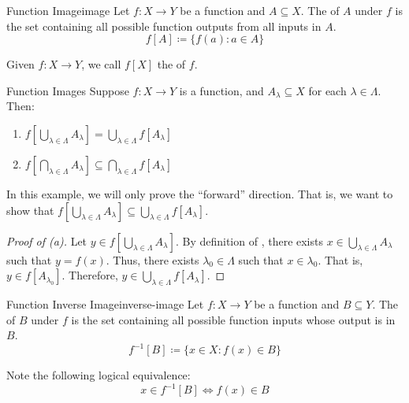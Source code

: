 \begin{dfnbox}{Function Image}{image}
    Let $f : X \to Y$ be a function and $A \subseteq X$. The  of $A$ under $f$ is the set containing all possible function outputs from all inputs in $A$.
    \tcblower
    \[ f[A] \coloneq \{ f(a) : a \in A \} \]
\end{dfnbox}

Given $f : X \to Y$, we call $f[X]$ the  of $f$.

\begin{exbox}{Function Images}{}
    Suppose $f : X \to Y$ is a function, and $A_\lambda \subseteq X$ for each $\lambda \in \Lambda$. Then:
    \begin{enumerate}[label=(\alph*)]
        \item $f \left[ \bigcup_{\lambda \in \Lambda} A_\lambda \right] = \bigcup_{\lambda \in \Lambda} f \left[ A_\lambda \right]$
        \item $f \left[ \bigcap_{\lambda \in \Lambda} A_\lambda \right] \subseteq \bigcap_{\lambda \in \Lambda} f \left[ A_\lambda \right]$
    \end{enumerate}
    \tcblower
    In this example, we will only prove the ``forward'' direction. That is, we want to show that $f \left[ \bigcup_{\lambda \in \Lambda} A_\lambda \right] \subseteq \bigcup_{\lambda \in \Lambda} f \left[ A_\lambda \right]$.
    \begin{proof}[Proof of (a)]
        Let $y \in f \left[ \bigcup_{\lambda \in \Lambda} A_\lambda \right]$. By definition of , there exists $x \in \bigcup_{\lambda \in \Lambda} A_\lambda$ such that $y = f(x)$. Thus, there exists $\lambda_0 \in \Lambda$ such that $x \in \lambda_0$. That is, $y \in f \left[ A_{\lambda_0} \right]$. Therefore, $y \in \bigcup_{\lambda \in \Lambda} f \left[ A_\lambda \right]$.
    \end{proof}
\end{exbox}

\begin{dfnbox}{Function Inverse Image}{inverse-image}
    Let $f : X \to Y$ be a function and $B \subseteq Y$. The  of $B$ under $f$ is the set containing all possible function inputs whose output is in $B$.
    \tcblower
    \[ f^{-1}[B] \coloneq \{ x \in X: f(x) \in B \} \]
\end{dfnbox}

Note the following logical equivalence:
\[ x \in f^{-1} [B] \iff f(x) \in B \]

